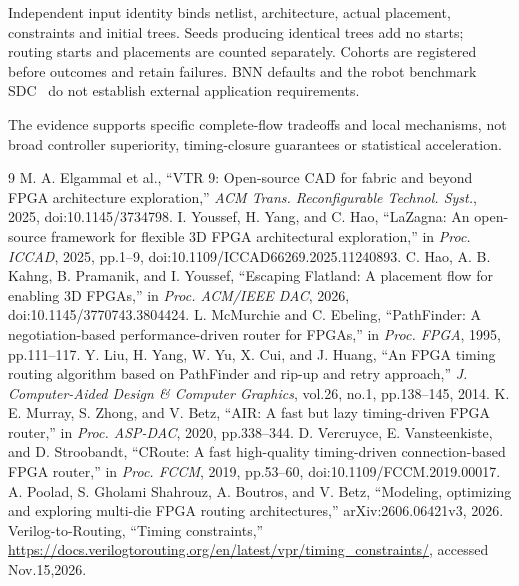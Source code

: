 \documentclass[conference,10pt]{IEEEtran}
\begin{document}
Independent input identity binds netlist, architecture, actual placement, constraints and initial trees. Seeds producing identical trees add no starts; routing starts and placements are counted separately. Cohorts are registered before outcomes and retain failures. BNN defaults and the robot benchmark SDC~\cite{vprsdc} do not establish external application requirements.

The evidence supports specific complete-flow tradeoffs and local mechanisms, not broad controller superiority, timing-closure guarantees or statistical acceleration.
\begin{thebibliography}{9}
 M. A. Elgammal et al., ``VTR 9: Open-source CAD for fabric and beyond FPGA architecture exploration,'' \emph{ACM Trans. Reconfigurable Technol. Syst.}, 2025, doi:10.1145/3734798.
 I. Youssef, H. Yang, and C. Hao, ``LaZagna: An open-source framework for flexible 3D FPGA architectural exploration,'' in \emph{Proc. ICCAD}, 2025, pp.1--9, doi:10.1109/ICCAD66269.2025.11240893.
 C. Hao, A. B. Kahng, B. Pramanik, and I. Youssef, ``Escaping Flatland: A placement flow for enabling 3D FPGAs,'' in \emph{Proc. ACM/IEEE DAC}, 2026, doi:10.1145/3770743.3804424.
 L. McMurchie and C. Ebeling, ``PathFinder: A negotiation-based performance-driven router for FPGAs,'' in \emph{Proc. FPGA}, 1995, pp.111--117.
 Y. Liu, H. Yang, W. Yu, X. Cui, and J. Huang, ``An FPGA timing routing algorithm based on PathFinder and rip-up and retry approach,'' \emph{J. Computer-Aided Design \& Computer Graphics}, vol.26, no.1, pp.138--145, 2014.
 K. E. Murray, S. Zhong, and V. Betz, ``AIR: A fast but lazy timing-driven FPGA router,'' in \emph{Proc. ASP-DAC}, 2020, pp.338--344.
 D. Vercruyce, E. Vansteenkiste, and D. Stroobandt, ``CRoute: A fast high-quality timing-driven connection-based FPGA router,'' in \emph{Proc. FCCM}, 2019, pp.53--60, doi:10.1109/FCCM.2019.00017.
 A. Poolad, S. Gholami Shahrouz, A. Boutros, and V. Betz, ``Modeling, optimizing and exploring multi-die FPGA routing architectures,'' arXiv:2606.06421v3, 2026.
 Verilog-to-Routing, ``Timing constraints,'' \url{https://docs.verilogtorouting.org/en/latest/vpr/timing_constraints/}, accessed Nov.15,2026.
\end{thebibliography}
\end{document}
